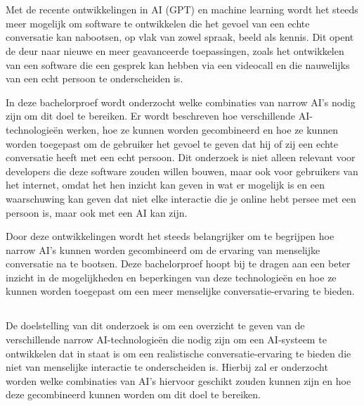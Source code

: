 
\chapter{}
\label{ch:inleiding}

Met de recente ontwikkelingen in AI (GPT) en machine learning wordt het steeds meer mogelijk om software te ontwikkelen die het gevoel van een echte conversatie kan nabootsen, op vlak van zowel spraak, beeld als kennis. Dit opent de deur naar nieuwe en meer geavanceerde toepassingen, zoals het ontwikkelen van een software die een gesprek kan hebben via een videocall en die nauwelijks van een echt persoon te onderscheiden is.

In deze bachelorproef wordt onderzocht welke combinaties van narrow AI's nodig zijn om dit doel te bereiken. Er wordt beschreven hoe verschillende AI-technologieën werken, hoe ze kunnen worden gecombineerd en hoe ze kunnen worden toegepast om de gebruiker het gevoel te geven dat hij of zij een echte conversatie heeft met een echt persoon. Dit onderzoek is niet alleen relevant voor developers die deze software zouden willen bouwen, maar ook voor gebruikers van het internet, omdat het hen inzicht kan geven in wat er mogelijk is en een waarschuwing kan geven dat niet elke interactie die je online hebt persee met een persoon is, maar ook met een AI kan zijn.

Door deze ontwikkelingen wordt het steeds belangrijker om te begrijpen hoe narrow AI's kunnen worden gecombineerd om de ervaring van menselijke conversatie na te bootsen. Deze bachelorproef hoopt bij te dragen aan een beter inzicht in de mogelijkheden en beperkingen van deze technologieën en hoe ze kunnen worden toegepast om een meer menselijke conversatie-ervaring te bieden.

\section{}
\label{sec:onderzoeksdoelstelling}

De doelstelling van dit onderzoek is om een overzicht te geven van de verschillende narrow AI-technologieën die nodig zijn om een AI-systeem te ontwikkelen dat in staat is om een realistische conversatie-ervaring te bieden die niet van menselijke interactie te onderscheiden is. Hierbij zal er onderzocht worden welke combinaties van AI's hiervoor geschikt zouden kunnen zijn en hoe deze gecombineerd kunnen worden om dit doel te bereiken.

